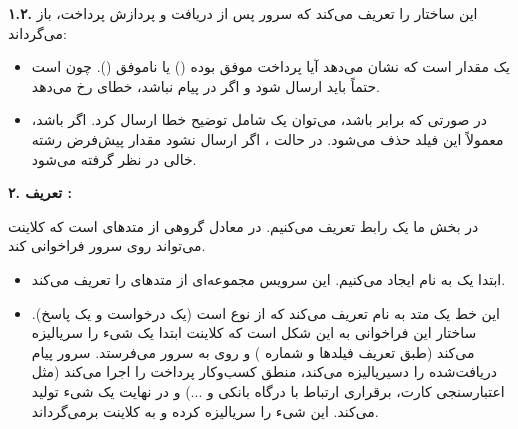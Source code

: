 \medskip

\noindent
\textbf{۱.۲. }  
این  ساختار  را تعریف می‌کند که سرور پس از دریافت  و پردازش پرداخت، باز می‌گرداند:  
\begin{itemize}
    \item {}  
    یک مقدار  است که نشان می‌دهد آیا پرداخت موفق بوده () یا ناموفق (). چون  است حتماً باید ارسال شود و اگر در پیام نباشد، خطای  رخ می‌دهد.  
    \item {}  
    در صورتی که  برابر  باشد، می‌توان یک  شامل توضیح خطا ارسال کرد. اگر   باشد، معمولاً این فیلد حذف می‌شود. در حالت ، اگر ارسال نشود مقدار پیش‌فرض رشته خالی در نظر گرفته می‌شود.  
\end{itemize}

\bigskip

\noindent
\textbf{۲. تعریف :}

در بخش  ما یک رابط  تعریف می‌کنیم.  در  معادل گروهی از متدهای  است که کلاینت می‌تواند روی سرور فراخوانی کند.  

\begin{itemize}
    \item {}  
    ابتدا یک  به نام  ایجاد می‌کنیم. این سرویس مجموعه‌ای از متدهای  را تعریف می‌کند.  
    \item {}  
    این خط یک متد  به نام  تعریف می‌کند که از نوع  است (یک درخواست و یک پاسخ).  
    ساختار این فراخوانی به این شکل است که کلاینت ابتدا یک شیء  را سریالیزه می‌کند (طبق تعریف فیلدها و شماره ) و روی  به سرور می‌فرستد. سرور پیام دریافت‌شده را دسیریالیزه می‌کند، منطق کسب‌وکار پرداخت را اجرا می‌کند (مثل اعتبارسنجی کارت، برقراری ارتباط با درگاه بانکی و ...) و در نهایت یک شیء  تولید می‌کند. این شیء را سریالیزه کرده و به کلاینت برمی‌گرداند.  
\end{itemize}

